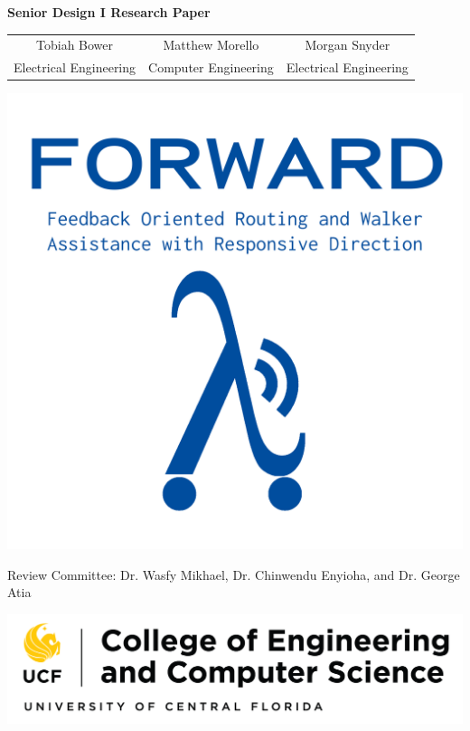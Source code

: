 \begin{titlepage}
	
	\thispagestyle{empty}
	
	\begin{center}
		\textbf{\Huge Senior Design I Research Paper} \\[\baselineskip]
		
		\begin{tabular}{c c c}
			{\large Tobiah Bower} & {\large Matthew Morello} & {\large Morgan Snyder} \\ 
			\small Electrical Engineering & \small Computer Engineering & \small Electrical Engineering
		\end{tabular}
	\end{center}
	
	\begin{center}
		\includegraphics[width=\textwidth]{./Images/FORWARD_logo_type_blue.png}
	\end{center}
	
	\begin{center}
		Review Committee: Dr. Wasfy Mikhael, Dr. Chinwendu Enyioha, and Dr. George Atia
	\end{center}
	
	\begin{center}
		\vspace{3\baselineskip} %
		\includegraphics[scale=0.4]{./Images/ucfece.png} %
	\end{center}
	
\end{titlepage}
